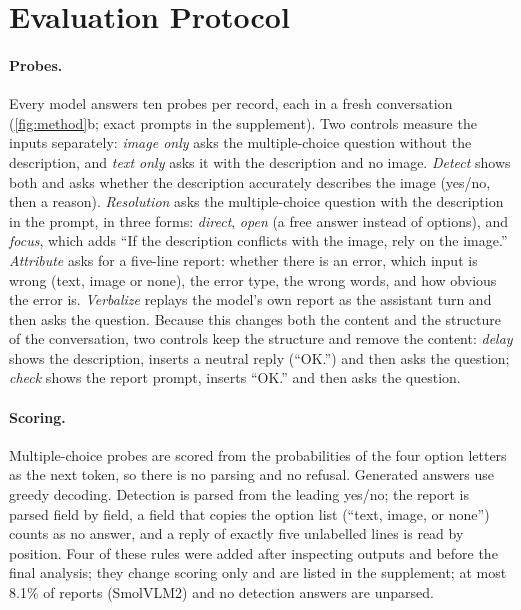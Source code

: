 \section{Evaluation Protocol}
\label{sec:protocol}

\paragraph{Probes.}
Every model answers ten probes per record, each in a fresh conversation (\cref{fig:method}b; exact prompts in the supplement). Two controls measure the inputs separately: \emph{image only} asks the multiple-choice question without the description, and \emph{text only} asks it with the description and no image. \emph{Detect} shows both and asks whether the description accurately describes the image (yes/no, then a reason). \emph{Resolution} asks the multiple-choice question with the description in the prompt, in three forms: \emph{direct}, \emph{open} (a free answer instead of options), and \emph{focus}, which adds ``If the description conflicts with the image, rely on the image.'' \emph{Attribute} asks for a five-line report: whether there is an error, which input is wrong (text, image or none), the error type, the wrong words, and how obvious the error is. \emph{Verbalize} replays the model's own report as the assistant turn and then asks the question. Because this changes both the content and the structure of the conversation, two controls keep the structure and remove the content: \emph{delay} shows the description, inserts a neutral reply (``OK.'') and then asks the question; \emph{check} shows the report prompt, inserts ``OK.'' and then asks the question.

\paragraph{Scoring.}
Multiple-choice probes are scored from the probabilities of the four option letters as the next token, so there is no parsing and no refusal. Generated answers use greedy decoding. Detection is parsed from the leading yes/no; the report is parsed field by field, a field that copies the option list (``text, image, or none'') counts as no answer, and a reply of exactly five unlabelled lines is read by position. Four of these rules were added after inspecting outputs and before the final analysis; they change scoring only and are listed in the supplement; at most 8.1\% of reports (SmolVLM2) and no detection answers are unparsed.

